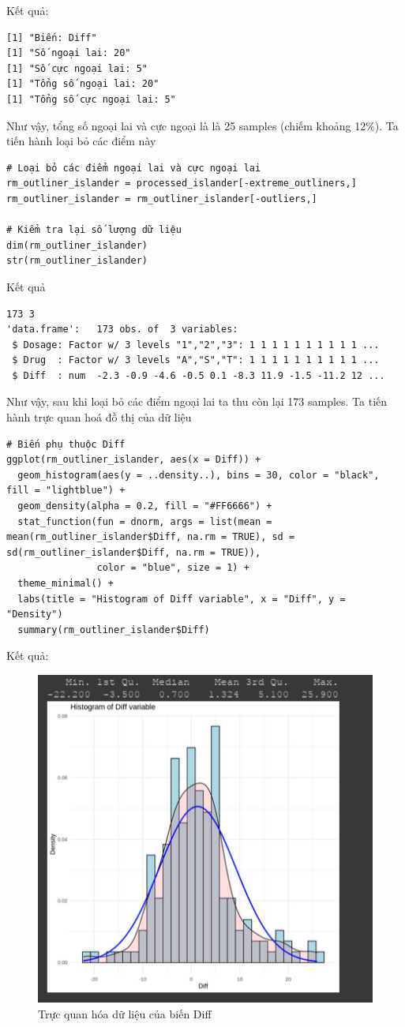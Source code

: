 \newpage
 Kết quả:
 \begin{lstlisting}
[1] "Biến: Diff"
[1] "Số ngoại lai: 20"
[1] "Số cực ngoại lai: 5"
[1] "Tổng số ngoại lai: 20"
[1] "Tổng số cực ngoại lai: 5"
 \end{lstlisting}

 Như vậy, tổng số ngoại lai và cực ngoại là là 25 samples (chiếm khoảng 12\%). Ta tiến hành loại bỏ các điểm này

 \begin{lstlisting}
# Loại bỏ các điểm ngoại lai và cực ngoại lai
rm_outliner_islander = processed_islander[-extreme_outliners,]
rm_outliner_islander = rm_outliner_islander[-outliers,]

# Kiểm tra lại số lượng dữ liệu
dim(rm_outliner_islander)
str(rm_outliner_islander)
 \end{lstlisting}
Kết quả
\begin{lstlisting}
173 3
'data.frame':	173 obs. of  3 variables:
 $ Dosage: Factor w/ 3 levels "1","2","3": 1 1 1 1 1 1 1 1 1 1 ...
 $ Drug  : Factor w/ 3 levels "A","S","T": 1 1 1 1 1 1 1 1 1 1 ...
 $ Diff  : num  -2.3 -0.9 -4.6 -0.5 0.1 -8.3 11.9 -1.5 -11.2 12 ...
\end{lstlisting}

\newpage
Như vậy, sau khi loại bỏ các điểm ngoại lai ta thu còn lại 173 samples. Ta tiến hành trực quan hoá đồ thị của dữ liệu

\begin{lstlisting}
# Biến phụ thuộc Diff
ggplot(rm_outliner_islander, aes(x = Diff)) +
  geom_histogram(aes(y = ..density..), bins = 30, color = "black", fill = "lightblue") +
  geom_density(alpha = 0.2, fill = "#FF6666") +
  stat_function(fun = dnorm, args = list(mean = mean(rm_outliner_islander$Diff, na.rm = TRUE), sd = sd(rm_outliner_islander$Diff, na.rm = TRUE)),
                color = "blue", size = 1) +
  theme_minimal() +
  labs(title = "Histogram of Diff variable", x = "Diff", y = "Density")
  summary(rm_outliner_islander$Diff)
\end{lstlisting}

Kết quả:
\begin{figure}[H]
    \centering
    \includegraphics[width=0.7\linewidth]{part01_figures/20.png}
    \caption{Trực quan hóa dữ liệu của biến Diff}
    \label{fig:Trực quan hóa dữ liệu của biến Diff}
\end{figure}

